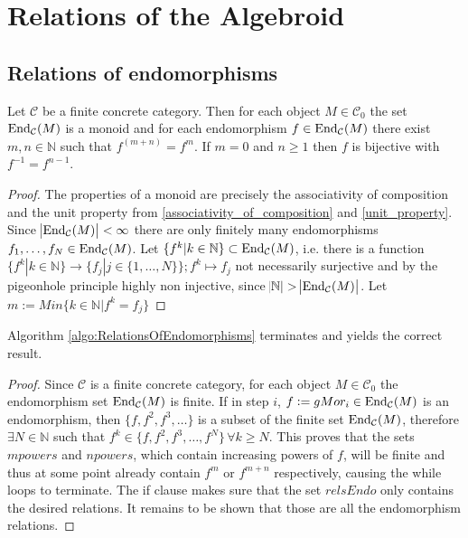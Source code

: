 
\section{Relations of the Algebroid}

\subsection{Relations of endomorphisms}


\begin{lemma}
Let $\mathcal{C}$ be a finite concrete category. Then for each object $M \in \mathcal{C}_{0}$ the set
$\textup{End}_{\mathcal{C}}(M)$ is a monoid and for each endomorphism $f \in \textup{End}_{\mathcal{C}}(M)$
there exist $m,n \in \mathbb{N}$ such that $f^{(m+n)}=f^{m}$. If $m = 0$ and $n \geq 1$ then $f$ is bijective with $f^{-1} = f^{n-1}$.
\begin{proof}
The properties of a monoid are precisely the associativity of composition and the unit property from \ref{associativity_of_composition} and \ref{unit_property}.
Since $\abs{\textup{End}_{\mathcal{C}}(M)}<\infty$ there are only finitely many endomorphisms $f_{1},\dots, f_{N} \in \textup{End}_{\mathcal{C}}(M)$.
Let $\{f^{k} | k \in \mathbb{N} \} \subset \textup{End}_{\mathcal{C}}(M)$, i.e. there is a function 
$\{f^{k} | k \in \mathbb{N}\} \rightarrow \{f_{j} | j \in \{1,\dots,N\}\}; f^{k} \mapsto f_{j}$ not necessarily surjective and 
by the pigeonhole principle highly non injective, since $\abs{\mathbb{N}}>\abs{\textup{End}_{\mathcal{C}}(M)}$.
Let $m := Min \{ k \in \mathbb{N}| f^{k} =  f_{j} \}$

\begin{minipage}{.45\textwidth}\phantom{}\end{minipage}
\end{proof}
\end{lemma}

\begin{lemma}
Algorithm \ref{algo:RelationsOfEndomorphisms} terminates and yields the correct result.
\begin{proof}
Since $\mathcal{C}$ is a finite concrete category, for each object $M \in \mathcal{C}_{0}$ the endomorphism set
$\textup{End}_{\mathcal{C}}(M)$ is finite. If in step $i$, $f := gMor_{i} \in \textup{End}_{\mathcal{C}}(M)$ is an endomorphism,
then $\{f, f^{2}, f^{3}, \dots\}$ is a subset of the finite set $\textup{End}_{\mathcal{C}}(M)$, therefore $\exists N \in \mathbb{N}$ such that
$f^{k} \in \{f, f^{2}, f^{3}, \dots, f^{N}\} \, \forall k \geq N$.
This proves that the sets $mpowers$ and $npowers$, which contain increasing powers of $f$, will be finite and thus at some point
already contain $f^{m}$ or $f^{m+n}$ respectively, causing the while loops to terminate.
The if clause makes sure that the set $relsEndo$ only contains the desired relations. It remains to be shown that those are all
the endomorphism relations.
\end{proof}
\end{lemma}


